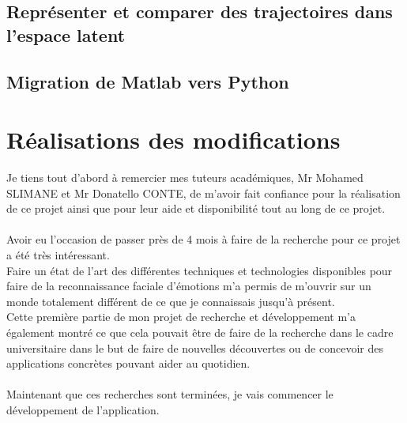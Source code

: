 \documentclass[poster]{polytech/polytech}
\begin{document}
\section{Représenter et comparer des trajectoires dans l'espace latent}

\section{Migration de Matlab vers Python}


\chapter{Réalisations des modifications}


Je tiens tout d'abord à remercier mes tuteurs académiques, Mr Mohamed SLIMANE et Mr Donatello CONTE, de m'avoir fait confiance pour la réalisation de ce projet ainsi que pour leur aide et disponibilité tout au long de ce projet.\\
\\
Avoir eu l'occasion de passer près de 4 mois à faire de la recherche pour ce projet a été très intéressant.\\
Faire un état de l'art des différentes techniques et technologies disponibles pour faire de la reconnaissance faciale d'émotions m'a permis de m'ouvrir sur un monde totalement différent de ce que je connaissais jusqu'à présent.\\
Cette première partie de mon projet de recherche et développement m'a également montré ce que cela pouvait être de faire de la recherche dans le cadre universitaire dans le but de faire de nouvelles découvertes ou de concevoir des applications concrètes pouvant aider au quotidien.\\
\\
Maintenant que ces recherches sont terminées, je vais commencer le développement de l'application.

\appendix
\end{document}

